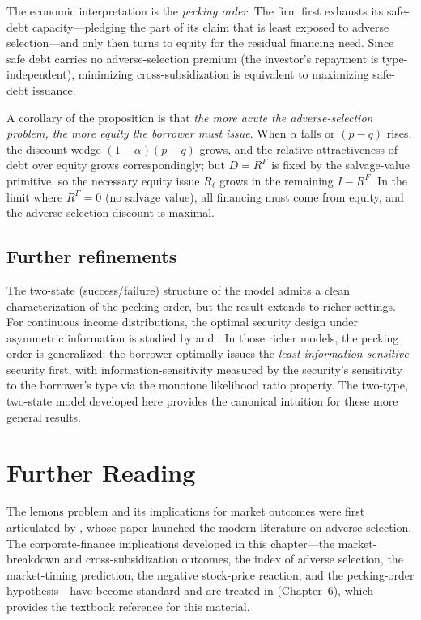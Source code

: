 \documentclass[11pt,a4paper,oneside]{book}
\theoremstyle{plain}
\theoremstyle{definition}
\theoremstyle{remark}
\numberwithin{equation}{chapter}
\begin{document}
The economic interpretation is the \emph{pecking order}.
The firm first exhausts its safe-debt capacity---pledging the part of its claim that is least exposed to adverse selection---and only then turns to equity for the residual financing need.
Since safe debt carries no adverse-selection premium (the investor's repayment is type-independent), minimizing cross-subsidization is equivalent to maximizing safe-debt issuance.

A corollary of the proposition is that \emph{the more acute the adverse-selection problem, the more equity the borrower must issue}.
When $\alpha$ falls or $(p - q)$ rises, the discount wedge $(1-\alpha)(p-q)$ grows, and the relative attractiveness of debt over equity grows correspondingly; but $D = R^F$ is fixed by the salvage-value primitive, so the necessary equity issue $R_\ell$ grows in the remaining $I - R^F$.
In the limit where $R^F = 0$ (no salvage value), all financing must come from equity, and the adverse-selection discount is maximal.

\subsection{Further refinements}

The two-state (success/failure) structure of the model admits a clean characterization of the pecking order, but the result extends to richer settings.
For continuous income distributions, the optimal security design under asymmetric information is studied by \citet{Innes1990} and \citet{DeMarzoDuffie1999}.
In those richer models, the pecking order is generalized: the borrower optimally issues the \emph{least information-sensitive} security first, with information-sensitivity measured by the security's sensitivity to the borrower's type via the monotone likelihood ratio property.
The two-type, two-state model developed here provides the canonical intuition for these more general results.

\section{Further Reading}
\label{sec:lemons-further}

The lemons problem and its implications for market outcomes were first articulated by \citet{Akerlof1970}, whose paper launched the modern literature on adverse selection.
The corporate-finance implications developed in this chapter---the market-breakdown and cross-subsidization outcomes, the index of adverse selection, the market-timing prediction, the negative stock-price reaction, and the pecking-order hypothesis---have become standard and are treated in \citet{Tirole2006} (Chapter~6), which provides the textbook reference for this material.
\end{document}
